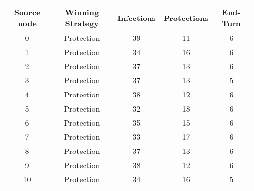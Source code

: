 \documentclass[results.tex]{subfiles}
\begin{document}
    \begin{center}
        \begin{tabular}{| c || c | c | c | c |}
            \hline
            {\bfseries Source node} & {\bfseries Winning Strategy} & {\bfseries Infections} & {\bfseries Protections}
            & {\bfseries End-Turn}
            \\  %
            \hline\hline
            0                       & Protection                   & 39                     & 11                      & 6                    \\
            \hline
            1                       & Protection                   & 34                     & 16                      & 6                    \\
            \hline
            2                       & Protection                   & 37                     & 13                      & 6                    \\
            \hline
            3                       & Protection                   & 37                     & 13                      & 5                    \\
            \hline
            4                       & Protection                   & 38                     & 12                      & 6                    \\
            \hline
            5                       & Protection                   & 32                     & 18                      & 6                    \\
            \hline
            6                       & Protection                   & 35                     & 15                      & 6                    \\
            \hline
            7                       & Protection                   & 33                     & 17                      & 6                    \\
            \hline
            8                       & Protection                   & 37                     & 13                      & 6                    \\
            \hline
            9                       & Protection                   & 38                     & 12                      & 6                    \\
            \hline
            10                      & Protection                   & 34                     & 16                      & 5                    \\

\end{tabular}
\end{center}
\end{document}
